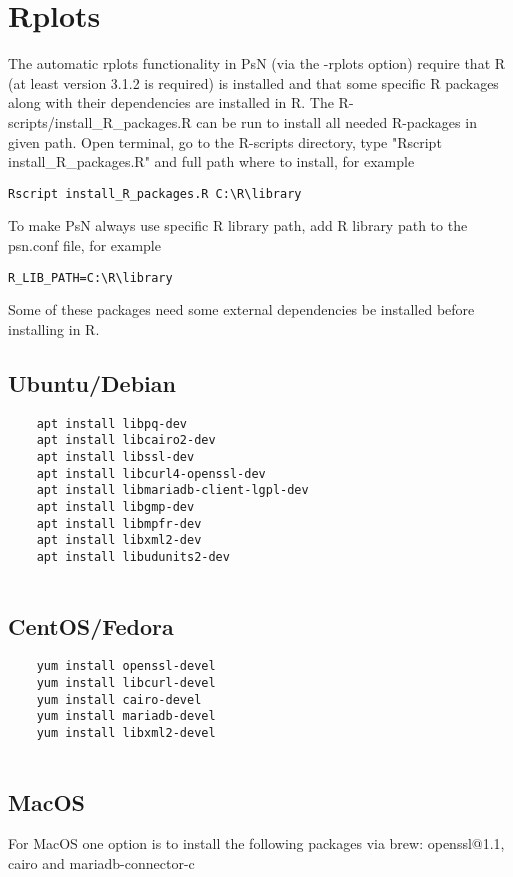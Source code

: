 \section{Rplots}

The automatic rplots functionality in PsN (via the -rplots option) require that R (at least version 3.1.2 is required) is installed and that some specific R packages along with their dependencies are installed in R. The R-scripts/install\_R\_packages.R can be run to install all needed R-packages in given path. Open terminal, go to the R-scripts directory, type "Rscript install\_R\_packages.R" and full path where to install, for example

\begin{verbatim}
Rscript install_R_packages.R C:\R\library
\end{verbatim}

To make PsN always use specific R library path, add R library path to the psn.conf file, for example

\begin{verbatim}
R_LIB_PATH=C:\R\library
\end{verbatim}

Some of these packages need some external dependencies be installed before installing in R.

\subsection{Ubuntu/Debian}
\begin{verbatim}
    apt install libpq-dev
    apt install libcairo2-dev
    apt install libssl-dev
    apt install libcurl4-openssl-dev
    apt install libmariadb-client-lgpl-dev
    apt install libgmp-dev
    apt install libmpfr-dev
    apt install libxml2-dev
    apt install libudunits2-dev
    
\end{verbatim}

\subsection{CentOS/Fedora}
\begin{verbatim}
    yum install openssl-devel
    yum install libcurl-devel
    yum install cairo-devel
    yum install mariadb-devel
    yum install libxml2-devel
    
\end{verbatim}

\subsection{MacOS}
For MacOS one option is to install the following packages via brew: openssl@1.1, cairo and mariadb-connector-c


